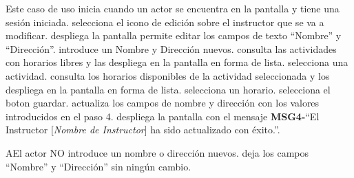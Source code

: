 	\begin{UCtrayectoria}{Este caso de uso inicia cuando un actor se encuentra en la pantalla  y tiene una sesión iniciada.}
		\UCpaso[\UCactor] selecciona el icono de edición sobre el instructor que se va a modificar.
		\UCpaso despliega la pantalla 
		\UCpaso permite editar los campos de texto “Nombre” y “Dirección”.
		\UCpaso[\UCactor] introduce un Nombre y Dirección nuevos.
		\UCpaso consulta las actividades con horarios libres y las despliega en la pantalla en forma de lista.
		\UCpaso[\UCactor] selecciona una actividad.
		\UCpaso consulta los horarios disponibles de la actividad seleccionada y los despliega en la pantalla en forma de lista.
		\UCpaso[\UCactor] selecciona un horario.
		\UCpaso[\UCactor] selecciona el boton guardar.
		\UCpaso actualiza los campos de nombre y dirección con los valores introducidos en el paso 4.
		\UCpaso {}
		\UCpaso despliega la pantalla  con el mensaje {\bf MSG4-}``El Instructor [{\em Nombre de Instructor}] ha sido actualizado con éxito.''.
	\end{UCtrayectoria}

		\begin{UCtrayectoriaA}{A}{El actor NO introduce un nombre o dirección nuevos.}
			\UCpaso deja los campos “Nombre” y “Dirección” sin ningún cambio.
		\end{UCtrayectoriaA}
		
